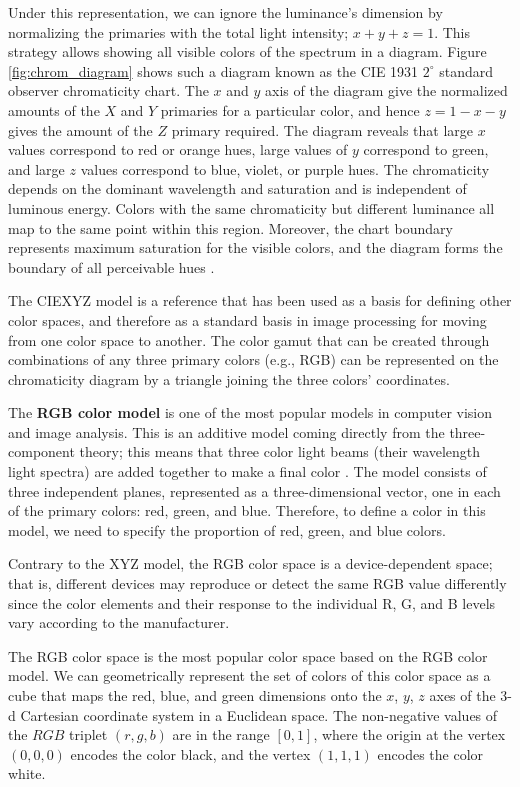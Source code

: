 Under this representation, we can ignore the luminance's dimension by normalizing the primaries with the total light intensity; $x+y+z=1$. This strategy allows showing all visible colors of the spectrum in a diagram. Figure \ref{fig:chrom_diagram} shows such a diagram known as the CIE 1931 $2^{\circ}$ standard observer chromaticity chart. The $x$ and $y$ axis of the diagram give the normalized amounts of the $X$ and $Y$ primaries for a particular color, and hence $z = 1 - x - y$ gives the amount of the $Z$ primary required. The diagram reveals that large $x$ values correspond to red or orange hues, large values of $y$ correspond to green, and large $z$ values correspond to blue, violet, or purple hues. The chromaticity depends on the dominant wavelength and saturation and is independent of luminous energy. Colors with the same chromaticity but different luminance all map to the same point within this region. Moreover, the chart boundary represents maximum saturation for the visible colors, and the diagram forms the boundary of all perceivable hues \citep{Bull:Book:2014}. 

The CIEXYZ model is a reference that has been used as a basis for defining other color spaces, and therefore as a standard basis in image processing for moving from one color space to another. The color gamut that can be created through combinations of any three primary colors (e.g., RGB) can be represented on the chromaticity diagram by a triangle joining the three colors' coordinates.

The \textbf{RGB color model} is one of the most popular models in computer vision and image analysis. This is an additive model coming directly from the three-component theory; this means that three color light beams (their wavelength light spectra) are added together to make a final color \citep{Gonzalez.Woods:Book:2008}. The model consists of three independent planes, represented as a three-dimensional vector, one in each of the primary colors: red, green, and blue. Therefore, to define a color in this model, we need to specify the proportion of red, green, and blue colors.

Contrary to the XYZ model, the RGB color space is a device-dependent space; that is, different devices may reproduce or detect the same RGB value differently since the color elements and their response to the individual R, G, and B levels vary according to the manufacturer.

The RGB color space is the most popular color space based on the RGB color model. We can geometrically represent the set of colors of this color space as a cube that maps the red, blue, and green dimensions onto the $x$, $y$, $z$ axes of the 3-d Cartesian coordinate system in a Euclidean space. The non-negative values of the $RGB$ triplet $(r,g,b)$ are in the range $[0,1]$, where the origin at the vertex $(0,0,0)$ encodes the color black, and the vertex $(1,1,1)$ encodes the color white. 

